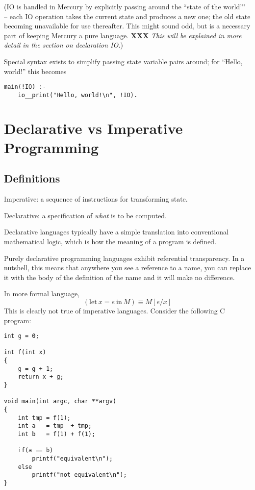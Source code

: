 \documentclass[a4paper,11pt,notitlepage,onecolumn]{article}
\newcommand{\XXX}[1]%
{{\small\textbf{XXX} \emph{#1}}}
\begin{document}
(IO is handled in Mercury by explicitly passing around the ``state
of the world''" -- each IO operation takes the current state and
produces a new one; the old state becoming unavailable for use
thereafter.  This might sound odd, but is a necessary part of
keeping Mercury a pure language.  \XXX{This will be explained in
more detail in the section on declaration IO.})

Special syntax exists to simplify passing state variable pairs
around; for ``Hello, world!'' this becomes
\begin{verbatim}
main(!IO) :-
    io__print("Hello, world!\n", !IO).
\end{verbatim}



\section{Declarative vs Imperative Programming}

\subsection{Definitions}

\begin{description}
\item{Imperative:} a sequence of instructions for transforming state.
\item{Declarative:} a specification of \emph{what} is to be computed.
\end{description}

Declarative languages typically have a simple translation into
conventional mathematical logic, which is how the meaning of a program
is defined.

Purely declarative programming languages exhibit referential
transparency.  In a nutshell, this means that anywhere you see a
reference to a name, you can replace it with the body of the
definition of the name and it will make no difference.

In more formal language,
\[
(\mathrm{let}\ x = e\ \mathrm{in}\ M)  \equiv  M[e/x]
\]
This is clearly not true of imperative languages.  Consider
the following C program:

\begin{verbatim}
int g = 0;

int f(int x)
{
    g = g + 1;
    return x + g;
}

void main(int argc, char **argv)
{
    int tmp = f(1);
    int a   = tmp  + tmp;
    int b   = f(1) + f(1);

    if(a == b)
        printf("equivalent\n");
    else
        printf("not equivalent\n");
}
\end{verbatim}
\end{document}
